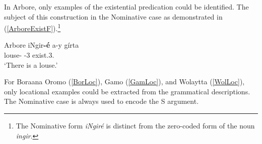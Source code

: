 



In Arbore, only examples of the existential predication could be identified. 
The subject of this construction in the Nominative case as demonstrated in (\ref{ArboreExistF}).\footnote{The Nominative form \emph{\textglotstop iNgir\'e} is distinct from the zero-coded form of the noun \emph{\textglotstop ingir}.}

\begin{exe} 
\ex\label{ArboreExistF} {Arbore}  \citep[Eastern Cushitic; Ethiopia; ][132]{Hayward:1984}\nopagebreak[4]
\gll \textglotstop iNgir\textbf{-\'e} \textglotstop a-y g\'irta\\
louse-\nom{} \pvs{}-3\sg{} exist.3\sg{}.\fem{}\\
\glt `There is a louse.'
\end{exe}

For Boraana Oromo (\ref{BorLoc}), Gamo (\ref{GamLoc}), and Wolaytta (\ref{WolLoc}), only locational examples could be extracted from the grammatical descriptions.
The Nominative case is always used to encode the S argument.

